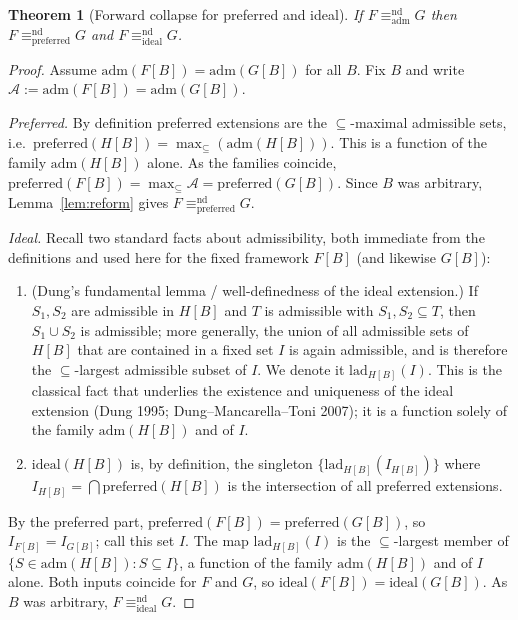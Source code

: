 \documentclass{amsart}
\newtheorem{theorem}{Theorem}
\theoremstyle{remark}
\begin{document}
\begin{theorem}[Forward collapse for preferred and ideal]\label{thm:adm-forward}
If $F\equiv^{\mathrm{nd}}_{\mathrm{adm}}G$ then
$F\equiv^{\mathrm{nd}}_{\mathrm{preferred}}G$ and
$F\equiv^{\mathrm{nd}}_{\mathrm{ideal}}G$.
\end{theorem}

\begin{proof}
Assume $\mathrm{adm}(F[B])=\mathrm{adm}(G[B])$ for all $B$.  Fix $B$ and write
$\mathcal A:=\mathrm{adm}(F[B])=\mathrm{adm}(G[B])$.

\emph{Preferred.}  By definition preferred extensions are the $\subseteq$-maximal
admissible sets, i.e.\ $\mathrm{preferred}(H[B])=\max_\subseteq(\mathrm{adm}(H
[B]))$.  This is a function of the family $\mathrm{adm}(H[B])$ alone.  As the
families coincide, $\mathrm{preferred}(F[B])=\max_\subseteq\mathcal A=
\mathrm{preferred}(G[B])$.  Since $B$ was arbitrary,
Lemma~\ref{lem:reform} gives $F\equiv^{\mathrm{nd}}_{\mathrm{preferred}}G$.

\emph{Ideal.}  Recall two standard facts about admissibility, both immediate
from the definitions and used here for the fixed framework $F[B]$ (and likewise
$G[B]$):
\begin{enumerate}
\item[(i)] (Dung's fundamental lemma / well-definedness of the ideal
extension.)  If $S_1,S_2$ are admissible in $H[B]$ and $T$ is admissible with
$S_1,S_2\subseteq T$, then $S_1\cup S_2$ is admissible; more generally, the
union of all admissible sets of $H[B]$ that are contained in a fixed set $I$ is
again admissible, and is therefore the $\subseteq$-largest admissible subset of
$I$.  We denote it $\mathrm{lad}_{H[B]}(I)$.  This is the classical fact that
underlies the existence and uniqueness of the ideal extension (Dung 1995;
Dung--Mancarella--Toni 2007); it is a function solely of the family
$\mathrm{adm}(H[B])$ and of $I$.
        \item[(ii)] $\mathrm{ideal}(H[B])$ is, by definition, the singleton
$\{\mathrm{lad}_{H[B]}(I_{H[B]})\}$ where $I_{H[B]}=\bigcap
\mathrm{preferred}(H[B])$ is the intersection of all preferred extensions.
\end{enumerate}
By the preferred part, $\mathrm{preferred}(F[B])=\mathrm{preferred}(G[B])$, so
$I_{F[B]}=I_{G[B]}$; call this set $I$.  The map $\mathrm{lad}_{H[B]}(I)$ is the
$\subseteq$-largest member of $\{S\in\mathrm{adm}(H[B]):S\subseteq I\}$, a
function of the family $\mathrm{adm}(H[B])$ and of $I$ alone.  Both inputs
coincide for $F$ and $G$, so $\mathrm{ideal}(F[B])=\mathrm{ideal}(G[B])$.  As
$B$ was arbitrary, $F\equiv^{\mathrm{nd}}_{\mathrm{ideal}}G$.
\end{proof}
\end{document}
